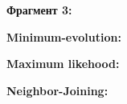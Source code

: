 \documentclass{article} %
\begin{document}
\textbf{Фрагмент 3:}

\textbf{Minimum-evolution:}

\begin{figure}[h]
	
\end{figure}

\textbf{Maximum likehood:}

\begin{figure}[h]
	
\end{figure}

\textbf{Neighbor-Joining:}

\begin{figure}[h]
	
\end{figure}
\end{document}
